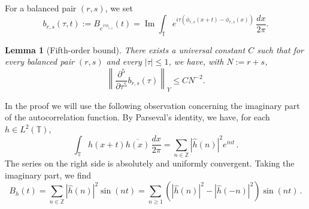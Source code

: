 \documentclass[11pt]{amsart}
\newtheorem{lemma}[theorem]{Lemma}
\theoremstyle{definition}
\theoremstyle{remark}
\newcommand{\T}{\mathbb T}
\newcommand{\Z}{\mathbb Z}
\newcommand{\wh}{\widehat}
\begin{document}
For a balanced pair $(r,s)$, we set
$$
b_{r,s}(\tau,t) := B_{e^{i\tau\phi_{r,s}}}(t) = \operatorname{Im}\int_\T
 e^{i\tau(\phi_{r,s}(x+t)-\phi_{r,s}(x))}\,\frac{dx}{2\pi}.
$$

\begin{lemma}[Fifth-order bound]\label{lem:fifth-order}
There exists a universal constant $C$ such that for every balanced pair $(r,s)$ and every $|\tau|\leq1$, we have, with $N:=r+s$,
\begin{equation}\label{eq:fifth-order-bound}
 \left\|\frac{\partial^5}{\partial\tau^5}
 b_{r,s}(\tau)\right\|_Y
 \leq C N^{-2}.
\end{equation}
\end{lemma}

In the proof we will use the following observation concerning the imaginary part of the autocorrelation function. By Parseval's identity, we have, for each $h\in L^2(\T)$,
    $$
    \int_\T h(x+t) \overline{h(x)}\,\frac{dx}{2\pi} = \sum_{n\in\Z} |\wh h(n)|^2 e^{int} \,.
    $$
    The series on the right side is absolutely and uniformly convergent. Taking the imaginary part, we find
    \begin{equation}\label{eq:B-sine-series}
        B_h(t) = \sum_{n\in\Z} |\wh h(n)|^2 \sin(nt) = \sum_{n\geq 1} \left( |\wh h(n)|^2 - |\wh h(-n)|^2 \right) \sin(nt) \,.
    \end{equation}
\end{document}
